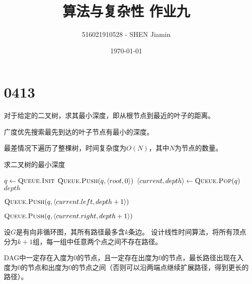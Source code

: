 \documentclass[answers]{exam}
\title{算法与复杂性 \quad 作业九}
\author{516021910528 - SHEN Jiamin}
\date{\today}
\begin{document}
\maketitle

\section{0413}\label{sec:0413}
\begin{questions}\label{qset:0413}

    \question 对于给定的二叉树，求其最小深度，即从根节点到最近的叶子的距离。

    \begin{solution}
        广度优先搜索最先到达的叶子节点有最小的深度。

        最差情况下遍历了整棵树，时间复杂度为$O(N)$，其中$N$为节点的数量。

        \begin{algorithm}[H]
            \caption{求二叉树的最小深度} \label{alg:0413:01}
            \begin{algorithmic}[1]
                \State $q \gets \Call{Queue.Init}{}$
                \State $\Call{Queue.Push}{q, \langle root, 0 \rangle}$
                \State $\langle current, depth \rangle \gets \Call{Queue.Pop}{q}$
                 
                \State \Return $depth$ 
                \EndIf

                 
                \State $\Call{Queue.Push}{q, \langle current.left, depth+1 \rangle}$
                \EndIf

                 
                \State $\Call{Queue.Push}{q, \langle current.right, depth+1 \rangle}$
                \EndIf
                \EndWhile
            \end{algorithmic}
        \end{algorithm}
    \end{solution}

    \newpage

    \question 设$G$是有向非循环图，其所有路径最多含$k$条边。
    设计线性时间算法，将所有顶点分为$k+1$组，每一组中任意两个点之间不存在路径。

    \begin{solution}
        DAG中一定存在入度为$0$的节点，且一定存在出度为$0$的节点，最长路径出现在入度为$0$的节点和出度为$0$的节点之间（否则可以沿两端点继续扩展路径，得到更长的路径）。


\end{solution}
\end{questions}
\end{document}
